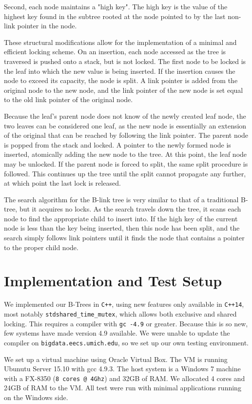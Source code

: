 \documentclass{sig-alternate}
\begin{document}
Second, each node maintains a "high key". The high key is the value of the highest key found in the subtree rooted at the node pointed to by the last non-link pointer in the node.

These structural modifications allow for the implementation of a minimal and efficient locking scheme. On an insertion, each node accessed as the tree is traversed is pushed onto a stack, but is not locked. The first node to be locked is the leaf into which the new value is being inserted. If the insertion causes the node to exceed its capacity, the node is split. A link pointer is added from the original node to the new node, and the link pointer of the new node is set equal to the old link pointer of the original node.

Because the leaf's parent node does not know of the newly created leaf node, the two leaves can be considered one leaf, as the new node is essentially an extension of the original that can be reached by following the link pointer. The parent node is popped from the stack and locked. A pointer to the newly formed node is inserted, atomically adding the new node to the tree. At this point, the leaf node may be unlocked. If the parent node is forced to split, the same split procedure is followed. This continues up the tree until the split cannot propagate any further, at which point the last lock is released.

The search algorithm for the B-link tree is very similar to that of a traditional B-tree, but it acquires no locks. As the search travels down the tree, it scans each node to find the appropriate child to insert into. If the high key of the current node is less than the key being inserted, then this node has been split, and the search simply follows link pointers until it finds the node that contains a pointer to the proper child node.
\section{Implementation and Test Setup}
We implemented our B-Trees in \texttt{C++}, using new features only available in \texttt{C++14}, most notably \texttt{stdshared\_time\_mutex}, which allows both exclusive and shared locking.  This requires a compiler with \texttt{gc -4.9} or greater.  Because this is so new, few systems have made version 4.9 available. We were unable to update the compiler on \texttt{bigdata.eecs.umich.edu}, so we set up our own testing environment.

We set up a virtual machine using Oracle Virtual Box.  The VM is running Ubunutu Server 15.10 with gcc 4.9.3.  The host system is a Windows 7 machine with a FX-8350 (\texttt{8 cores @ 4Ghz}) and 32GB of RAM.  We allocated 4 cores and 24GB of RAM to the VM.  All test were run with minimal applications running on the Windows side.
\end{document}
